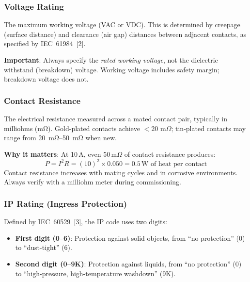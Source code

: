 \documentclass[11pt,letterpaper,twoside,openany]{book}
\newcommand{\mohm}{\,\text{m}\Omega}
\begin{document}
\subsubsection{Voltage Rating}

The maximum working voltage (VAC or VDC). This is determined by creepage (surface distance) and clearance (air gap) distances between adjacent contacts, as specified by IEC~61984~[2]. 

\textbf{Important}: Always specify the \emph{rated working voltage}, not the dielectric withstand (breakdown) voltage. Working voltage includes safety margin; breakdown voltage does not.

\subsubsection{Contact Resistance}

The electrical resistance measured across a mated contact pair, typically in milliohms (\si{\milli\ohm}). Gold-plated contacts achieve $<20\,\mohm$; tin-plated contacts may range from \SIrange{20}{50}{\milli\ohm} when new.

\textbf{Why it matters}: At 10\,A, even $50\mohm$ of contact resistance produces:
\begin{equation}
  P = I^2 R = (10)^2 \times 0.050 = 0.5\,\text{W} \text{ of heat per contact}
\end{equation}
Contact resistance increases with mating cycles and in corrosive environments. Always verify with a milliohm meter during commissioning.

\subsubsection{IP Rating (Ingress Protection)}

Defined by IEC~60529~[3], the IP code uses two digits:
\begin{itemize}[nosep,leftmargin=1.5em]
  \item \textbf{First digit (0--6)}: Protection against solid objects, from ``no protection'' (0) to ``dust-tight'' (6).
  \item \textbf{Second digit (0--9K)}: Protection against liquids, from ``no protection'' (0) to ``high-pressure, high-temperature washdown'' (9K).
\end{itemize}
\end{document}
